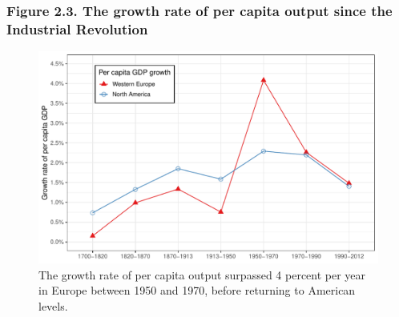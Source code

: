 \documentclass[t]{beamer}\usepackage[]{graphicx}\usepackage[]{color}
\newenvironment{knitrout}{}{} %
\begin{document}
\begin{frame}[label=Figure_2_3]
\frametitle{Figure 2.3. The growth rate of per capita output since the Industrial Revolution}
\begin{figure}[t]
\begin{minipage}[b]{\textwidth}
\centering
\begin{knitrout}\footnotesize
{}\color{fgcolor}

{\centering \includegraphics[width=1\linewidth]{figures/color/Figure_2_3} 

}



\end{knitrout}
\caption{The growth rate of per capita output surpassed 4 percent per year in Europe between 1950 and 1970, before returning to American levels.}
\end{minipage}
\end{figure}
\end{frame}
\end{document}
